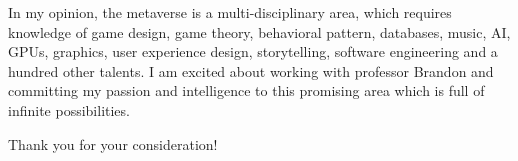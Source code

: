 \documentclass[12pt]{article}
\begin{document}
\bigskip

In my opinion, the metaverse is a multi-disciplinary area, which requires knowledge of game design, game theory, behavioral pattern, databases, music, AI, GPUs, graphics, user experience design, storytelling, software engineering and a hundred other talents. I am excited about working with professor Brandon and committing my passion and intelligence to this promising area which is full of infinite possibilities.


\bigskip

Thank you for your consideration!
\end{document}

